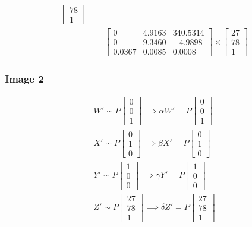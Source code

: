 \documentclass[12pt, oneside]{article}
\begin{document}
\begin{align*}
\begin{bmatrix}
        78 \\
        1 
    \end{bmatrix} \\
&= \begin{bmatrix}
    0   &  4.9163   &   340.5314 \\
    0   &  9.3460   &   -4.9898\\
    0.0367   &  0.0085   &   0.0008
    \end{bmatrix} 
\times 
    \begin{bmatrix}
        27 \\
        78 \\
        1 
    \end{bmatrix}
\end{align*} 

\subsubsection*{Image 2} 

\begin{align*}
  W' \sim P
   \begin{bmatrix}
  0   \\
  0   \\
  1  
  \end{bmatrix} \implies 
  \alpha W' = P
   \begin{bmatrix}
  0   \\
  0   \\
  1  
  \end{bmatrix}   \\
  X' \sim P
   \begin{bmatrix}
  0   \\
  1   \\
  0  
  \end{bmatrix} \implies 
  \beta X' = P
   \begin{bmatrix}
  0   \\
  1   \\
  0  
  \end{bmatrix}  \\
  Y' \sim P
   \begin{bmatrix}
  1   \\
  0   \\
  0  
  \end{bmatrix} \implies 
  \gamma Y' = P
   \begin{bmatrix}
  1   \\
  0   \\
  0  
  \end{bmatrix}   \\
  Z' \sim P
   \begin{bmatrix}
  27   \\
  78   \\
  1  
  \end{bmatrix} \implies 
  \delta Z' = P
   \begin{bmatrix}
  27   \\
  78   \\
  1  
  \end{bmatrix} 
  \end{align*}
  
\end{document}

